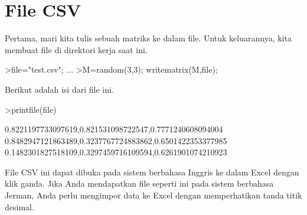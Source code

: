 \documentclass[a4paper,11pt,oneside,enabledeprecatedfontcommands]{scrbook}
\newenvironment{eulernotebook}{}{}
\newcommand{\eulerheading}[1]{\chapter{#1}}
\newenvironment{eulercomment}{\par\medskip\noindent}{\par\medskip}
\begin{document}
\begin{eulernotebook}
		\eulerheading{File CSV}
		\begin{eulercomment}
			Pertama, mari kita tulis sebuah matriks ke dalam file. Untuk keluarannya, kita membuat file di
			direktori kerja saat ini.
		\end{eulercomment}
		\begin{eulerprompt}
			>file="test.csv";  ...
			>M=random(3,3); writematrix(M,file);
		\end{eulerprompt}
		\begin{eulercomment}
			Berikut adalah isi dari file ini.
		\end{eulercomment}
		\begin{eulerprompt}
			>printfile(file)
		\end{eulerprompt}
		\begin{euleroutput}
			0.8221197733097619,0.821531098722547,0.7771240608094004
			0.8482947121863489,0.3237767724883862,0.6501422353377985
			0.1482301827518109,0.3297459716109594,0.6261901074210923
		\end{euleroutput}
		\begin{eulercomment}
			File CSV ini dapat dibuka pada sistem berbahasa Inggris ke dalam Excel dengan klik ganda. Jika Anda
			mendapatkan file seperti ini pada sistem berbahasa Jerman, Anda perlu mengimpor data ke Excel dengan
			memperhatikan tanda titik desimal.
			

\end{eulercomment}
\end{eulernotebook}
\end{document}
